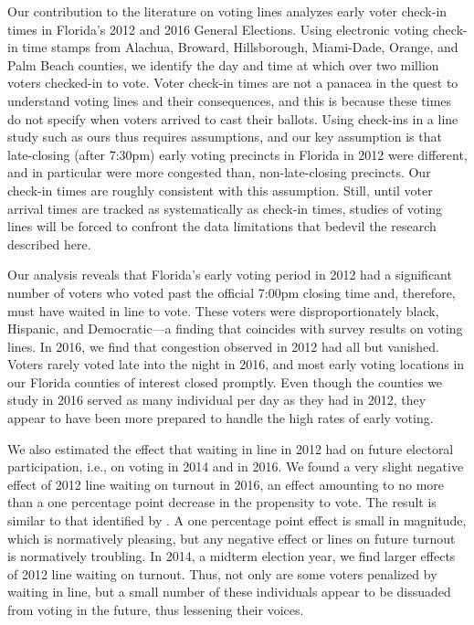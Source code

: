 \documentclass[12pt,titlepage]{article}
\begin{document}


Our contribution to the literature on voting lines analyzes early
voter check-in times in Florida's 2012 and 2016 General Elections.
Using electronic voting check-in time stamps from Alachua, Broward,
Hillsborough, Miami-Dade, Orange, and Palm Beach counties, we identify
the day and time at which over two million voters checked-in to vote.
Voter check-in times are not a panacea in the quest to understand
voting lines and their consequences, and this is because these times
do not specify when voters arrived to cast their ballots. Using
check-ins in a line study such as ours thus requires assumptions, and
our key assumption is that late-closing (after 7:30pm) early voting
precincts in Florida in 2012 were different, and in particular were
more congested than, non-late-closing precincts. Our check-in times
are roughly consistent with this assumption. Still, until voter
arrival times are tracked as systematically as check-in times, studies
of voting lines will be forced to confront the data limitations that
bedevil the research described here.

Our analysis reveals that Florida's early voting period in 2012 had a
significant number of voters who voted past the official 7:00pm
closing time and, therefore, must have waited in line to vote.  These
voters were disproportionately black, Hispanic, and Democratic---a
finding that coincides with survey results on voting lines.  In 2016,
we find that congestion observed in 2012 had all but vanished.  Voters
rarely voted late into the night in 2016, and most early voting
locations in our Florida counties of interest closed promptly.  Even
though the counties we study in 2016 served as many individual per day
as they had in 2012, they appear to have been more prepared to handle
the high rates of early voting.
  
We also estimated the effect that waiting in line in 2012 had on future
electoral participation, i.e., on voting in 2014 and in 2016.  We
found a very slight negative effect of 2012 line waiting on turnout in
2016, an effect amounting to no more than a one percentage point
decrease in the propensity to vote. The result is similar to that
identified by \citet{pettigrew:racegapwaittimes}.  A one percentage
point effect is small in magnitude, which is normatively pleasing, but
any negative effect or lines on future turnout is normatively
troubling.  In 2014, a midterm election year, we find larger effects
of 2012 line waiting on turnout.  Thus, not only are some voters
penalized by waiting in line, but a small number of these individuals
appear to be dissuaded from voting in the future, thus lessening their
voices.
\end{document}
